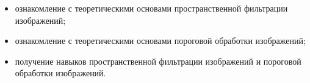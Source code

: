 
\begin{itemize}

	\item ознакомление с теоретическими основами пространственной фильтрации изображений;
	\item ознакомление с теоретическими основами пороговой обработки изображений;
	\item получение навыков пространственной фильтрации изображений и пороговой обработки изображений.

\end{itemize}

